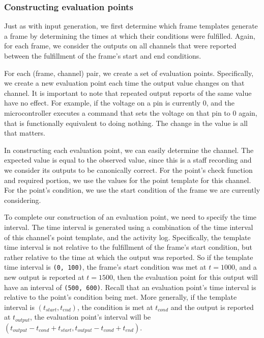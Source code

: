 \documentclass[12pt]{article}
\begin{document}
\subsubsection{Constructing evaluation points}
\label{sec:using-point-templates}
Just as with input generation, we first determine which frame templates generate a frame by determining the times at which their conditions were fulfilled.  Again, for each frame, we consider the outputs on all channels that were reported between the fulfillment of the frame's start and end conditions.

For each (frame, channel) pair, we create a set of evaluation points.  Specifically, we create a new evaluation point each time the output value changes on that channel.  It is important to note that repeated output reports of the same value have no effect.  For example, if the voltage on a pin is currently 0, and the microcontroller executes a command that sets the voltage on that pin to 0 again, that is functionally equivalent to doing nothing.  The change in the value is all that matters.

In constructing each evaluation point, we can easily determine the channel.  The expected value is equal to the observed value, since this is a staff recording and we consider its outputs to be canonically correct.   For the point's check function and required portion, we use the values for the point template for this channel.  For the point's condition, we use the start condition of the frame we are currently considering.

To complete our construction of an evaluation point, we need to specify the time interval.  The time interval is generated using a combination of the time interval of this channel's point template, and the activity log.  Specifically, the template time interval is not relative to the fulfillment of the frame's start condition, but rather relative to the time at which the output was reported.  So if the template time interval is \texttt{(0, 100)}, the frame's start condition was met at $t=1000$, and a new output is reported at $t=1500$, then the evaluation point for this output will have an interval of \texttt{(500, 600)}.  Recall that an evaluation point's time interval is relative to the point's condition being met.  More generally, if the template interval is $(t_{start}, t_{end})$, the condition is met at $t_{cond}$ and the output is reported at $t_{output}$, the evaluation point's interval will be $(t_{output} - t_{cond} + t_{start}, t_{output} - t_{cond} + t_{end})$.
\end{document}
